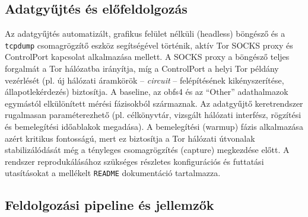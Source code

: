 \documentclass[a4paper,oneside]{article}
\begin{document}
\subsection{Adatgyűjtés és előfeldolgozás}
Az adatgyűjtés automatizált, grafikus felület nélküli (headless) böngésző és a \texttt{tcpdump} csomagrögzítő eszköz segítségével történik, aktív Tor SOCKS proxy és ControlPort kapcsolat alkalmazása mellett.
A SOCKS proxy a böngésző teljes forgalmát a Tor hálózatba irányítja, míg a ControlPort a helyi Tor példány vezérlését (pl. új hálózati áramkörök -- \textit{circuit} -- felépítésének kikényszerítése, állapotlekérdezés) biztosítja.
A baseline, az obfs4 és az ``Other'' adathalmazok egymástól elkülönített mérési fázisokból származnak.
Az adatgyűjtő keretrendszer rugalmasan paraméterezhető (pl. célkönyvtár, vizsgált hálózati interfész, rögzítési és bemelegítési időablakok megadása).
A bemelegítési (warmup) fázis alkalmazása azért kritikus fontosságú, mert ez biztosítja a Tor hálózati útvonalak stabilizálódását még a tényleges csomagrögzítés (capture) megkezdése előtt.
A rendszer reprodukálásához szükséges részletes konfigurációs és futtatási utasításokat a mellékelt \texttt{README} dokumentáció tartalmazza.
\subsection{Feldolgozási pipeline és jellemzők}
\end{document}
